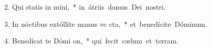 \begin{flushleft}
\begin{enumerate}[leftmargin=*]
\setcounter{enumi}{1}

\item Qui statis in  mini,~* \mbox{in átriis domus Dei nostri.}

\item In nóctibus extóllite manus ve  cta,~* \mbox{et benedícite Dóminum.}

\item Benedícat te Dómi  on,~* \mbox{qui fecit cælum et terram.}


\end{enumerate}
\end{flushleft}

